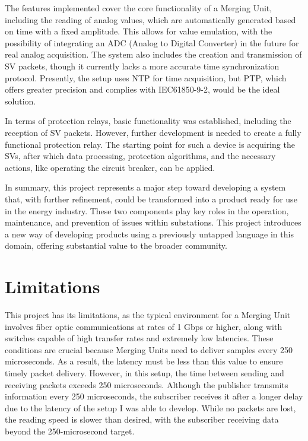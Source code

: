 The features implemented cover the core functionality of a Merging Unit, including the reading of analog values, which are automatically generated based on time with a fixed amplitude. This allows for value emulation, with the possibility of integrating an ADC (Analog to Digital Converter) in the future for real analog acquisition. The system also includes the creation and transmission of SV packets, though it currently lacks a more accurate time synchronization protocol. Presently, the setup uses NTP for time acquisition, but PTP, which offers greater precision and complies with IEC61850-9-2, would be the ideal solution.

In terms of protection relays, basic functionality was established, including the reception of SV packets. However, further development is needed to create a fully functional protection relay. The starting point for such a device is acquiring the SVs, after which data processing, protection algorithms, and the necessary actions, like operating the circuit breaker, can be applied.

In summary, this project represents a major step toward developing a system that, with further refinement, could be transformed into a product ready for use in the energy industry. These two components play key roles in the operation, maintenance, and prevention of issues within substations. This project introduces a new way of developing products using a previously untapped language in this domain, offering substantial value to the broader community.

\section{Limitations}

This project has its limitations, as the typical environment for a Merging Unit involves fiber optic communications at rates of 1 Gbps or higher, along with switches capable of high transfer rates and extremely low latencies. These conditions are crucial because Merging Units need to deliver samples every 250 microseconds. As a result, the latency must be less than this value to ensure timely packet delivery. However, in this setup, the time between sending and receiving packets exceeds 250 microseconds. Although the publisher transmits information every 250 microseconds, the subscriber receives it after a longer delay due to the latency of the setup I was able to develop. While no packets are lost, the reading speed is slower than desired, with the subscriber receiving data beyond the 250-microsecond target.

